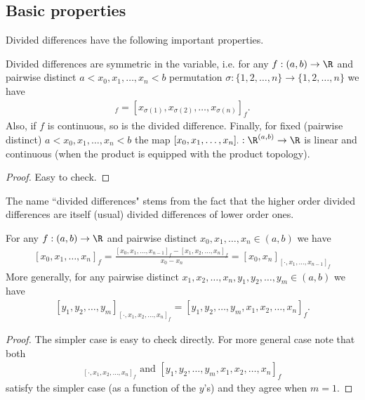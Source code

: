 \subsection{Basic properties}

Divided differences have the following important properties.

\begin{prop}
	Divided differences are symmetric in the variable, i.e. for any $f : (a, b) \to \R$ and pairwise distinct $a < x_{0}, x_{1}, \ldots, x_{n} < b$ permutation $\sigma : \{1, 2, \ldots, n\} \to \{1, 2, \ldots, n\}$ we have
	\begin{align*}
		[x_{1}, x_{2}, \ldots, x_{n}]_{f} = [x_{\sigma(1)}, x_{\sigma(2)}, \ldots, x_{\sigma(n)}]_{f}.
	\end{align*}
	Also, if $f$ is continuous, so is the divided difference.
	Finally, for fixed (pairwise distinct) $a < x_{0}, x_{1}, \ldots, x_{n} < b$ the map $[x_{0}, x_{1}, \ldots, x_{n}]_{\cdot} : \R^{(a, b)} \to \R$ is linear and continuous (when the product is equipped with the product topology).
\end{prop}
\begin{proof}
	Easy to check.
\end{proof}

The name ``divided differences" stems from the fact that the higher order divided differences are itself (usual) divided differences of lower order ones.

\begin{prop}\label{nesting_property}
	For any $f : (a, b) \to \R$ and pairwise distinct $x_{0}, x_{1}, \ldots, x_{n} \in (a, b)$ we have
	\begin{align}\label{divdif_rec}
		[x_{0}, x_{1}, \ldots, x_{n}]_{f} = \frac{[x_{0}, x_{1}, \ldots, x_{n - 1}]_{f} - [x_{1}, x_{2}, \ldots, x_{n}]_{f}}{x_{0} - x_{n}} = [x_{0}, x_{n}]_{[\cdot, x_{1}, \ldots, x_{n - 1}]_f}
	\end{align}
	More generally, for any pairwise distinct $x_{1}, x_{2}, \ldots, x_{n}, y_{1}, y_{2}, \ldots, y_{m} \in (a, b)$ we have
	\begin{align}\label{nesting_rule}
		[y_{1}, y_{2}, \ldots, y_{m}]_{[\cdot, x_{1}, x_{2}, \ldots, x_{n}]_{f}} = [y_{1}, y_{2}, \ldots, y_{m}, x_{1}, x_{2}, \ldots, x_{n}]_{f}.
	\end{align}
\end{prop}
\begin{proof}
	The simpler case is easy to check directly. For more general case note that both
	\begin{align*}
	[y_{1}, y_{2}, \ldots, y_{m}]_{[\cdot, x_{1}, x_{2}, \ldots, x_{n}]_{f}} \text{ and } [y_{1}, y_{2}, \ldots, y_{m}, x_{1}, x_{2}, \ldots, x_{n}]_{f}
	\end{align*}
	satisfy the simpler case (as a function of the $y$'s) and they agree when $m = 1$.
\end{proof}

